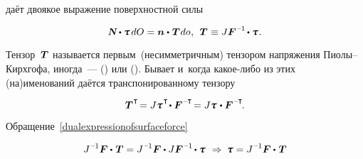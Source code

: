 \begin{otherlanguage}{russian}

\vspace{-0.2em} \noindent даёт двоякое выражение поверхностной силы

\nopagebreak\vspace{-0.16em}\begin{equation}\label{dualexpressionofsurfaceforce}
\mathboldN \dotp \cauchystress \hspace{.25ex} dO
= \bm{n} \dotp \hspace{.12ex} \firstpiolakirchhoffstress \hspace{.1ex} do
\hspace{.1ex}, \:\:
\firstpiolakirchhoffstress \hspace{.1ex} \equiv J \bm{F}^{\hspace{.1ex}\expminusone} \hspace{-0.2ex} \dotp \cauchystress \hspace{.1ex}.
\end{equation}

\vspace{-0.2em} Тензор~${\hspace{.1ex}\bm{T}}$ называется первым~(несимметричным) тензором напряжения Пиолы--Кирхгофа, иногда~---  () или  (). Бывает и~когда какое\hbox{-}либо из этих (на)именований даётся транспонированному тензору

\nopagebreak\vspace{-0.1em}\begin{equation*}
\firstpiolakirchhoffstress^{\hspace{.1ex}\T} \hspace{-0.32ex}
= J \cauchystress^{\hspace{.16ex}\T} \hspace{-0.32ex} \dotp \bm{F}^{\hspace{.1ex}\expminusT} \hspace{-0.32ex}
= J \cauchystress \hspace{.16ex} \dotp \bm{F}^{\hspace{.1ex}\expminusT} \hspace{-0.25ex}.
\end{equation*}

Обращение~\eqref{dualexpressionofsurfaceforce}

\begin{equation*}
J^{\hspace{.12ex}\expminusone} \bm{F} \dotp \hspace{.16ex} \firstpiolakirchhoffstress = J^{\hspace{.12ex}\expminusone} \bm{F} \dotp J \bm{F}^{\hspace{.16ex}\expminusone} \hspace{-0.2ex} \dotp \cauchystress
\:\,\Rightarrow\:
\cauchystress = J^{\hspace{.12ex}\expminusone} \bm{F} \dotp \hspace{.16ex} \firstpiolakirchhoffstress
\end{equation*}


\end{otherlanguage}
